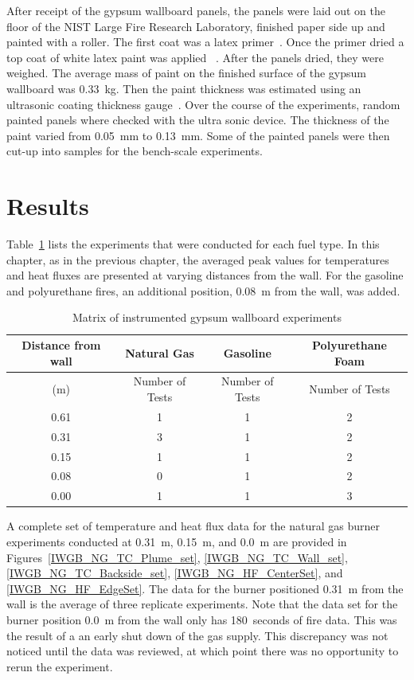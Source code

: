 \documentclass[twoside]{uocthesis}
\begin{document}
{After receipt of the gypsum wallboard panels, the panels were laid out on the floor of the NIST Large Fire Research Laboratory, finished paper side up and painted with a roller.  The first coat was a latex primer~\cite{Latex_Primer}.  Once the primer dried a top coat of white latex paint was applied ~\cite{Latex_Paint}.  After the panels dried, they were weighed. The average mass of paint on the finished surface of the gypsum wallboard was 0.33~kg. Then the paint thickness was estimated using an ultrasonic coating thickness gauge~\cite{defelsko}.  Over the course of the experiments, random painted panels where checked with the ultra sonic device. The thickness of the paint varied from 0.05~mm to 0.13~mm.  Some of the painted panels were then cut-up into samples for the bench-scale experiments.


\section{Results}

Table~\ref{tab:IWGB_experiments} lists the experiments that were conducted for each fuel type.  In this chapter, as in the previous chapter, the averaged peak values for temperatures and heat fluxes are presented at varying distances from the wall.  For the gasoline and polyurethane fires, an additional position, 0.08~m from the wall, was added.

\begin{table}[ht!]
	\centering
	\begin{tabular}{|c|c|c|c|}
		\hline Distance from wall  	& Natural Gas 		& Gasoline			& Polyurethane Foam \\
		\hline (m) 					& Number of Tests 	& Number of Tests  	& Number of Tests 	\\ 
		\hline 0.61 				& 1 				& 1 				& 2 			 	\\
		\hline 0.31					& 3	 				& 1					& 2 			 	\\
		\hline 0.15					& 1				 	& 1					& 2 			 	\\
		\hline 0.08					& 0 				& 1 				& 2 	 			\\
		\hline 0.00					& 1 				& 1 				& 3 	 			\\
		\hline
	\end{tabular}
	\caption[Matrix of instrumented gypsum wallboard experiments]{Matrix of instrumented gypsum wallboard experiments}
	\label{tab:IWGB_experiments}
\end{table}

A complete set of temperature and heat flux data for the natural gas burner experiments conducted at 0.31~m, 0.15~m, and 0.0~m are provided in Figures~\ref{IWGB_NG_TC_Plume_set}, \ref{IWGB_NG_TC_Wall_set}, \ref{IWGB_NG_TC_Backside_set}, \ref{IWGB_NG_HF_CenterSet}, and \ref{IWGB_NG_HF_EdgeSet}.  The data for the burner positioned 0.31~m from the wall is the average of three replicate experiments.  Note that the data set for the burner position 0.0~m from the wall only has 180~seconds of fire data.  This was the result of a an early shut down of the gas supply.  This discrepancy was not noticed until the data was reviewed, at which point there was no opportunity to rerun the experiment.    

}
\end{document}
